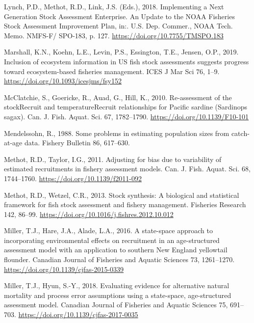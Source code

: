 \documentclass[]{article}
\begin{document}
\leavevmode\hypertarget{ref-lynch2018Implementing}{}%
Lynch, P.D., Methot, R.D., Link, J.S. (Eds.), 2018. Implementing a Next
Generation Stock Assessment Enterprise. An Update to the NOAA Fisheries
Stock Assessment Improvement Plan, in:. U.S. Dep. Commer., NOAA Tech.
Memo. NMFS-F/ SPO-183, p. 127. \url{https://doi.org/10.7755/TMSPO.183}

\leavevmode\hypertarget{ref-marshall2019Inclusion}{}%
Marshall, K.N., Koehn, L.E., Levin, P.S., Essington, T.E., Jensen, O.P.,
2019. Inclusion of ecosystem information in US fish stock assessments
suggests progress toward ecosystem-based fisheries management. ICES J
Mar Sci 76, 1--9. \url{https://doi.org/10.1093/icesjms/fsy152}

\leavevmode\hypertarget{ref-mcclatchie2010Reassessment}{}%
McClatchie, S., Goericke, R., Auad, G., Hill, K., 2010. Re-assessment of
the stockRecruit and temperatureRecruit relationships for Pacific
sardine (Sardinops sagax). Can. J. Fish. Aquat. Sci. 67, 1782--1790.
\url{https://doi.org/10.1139/F10-101}

\leavevmode\hypertarget{ref-mendelssohn1988Problems}{}%
Mendelssohn, R., 1988. Some problems in estimating population sizes from
catch-at-age data. Fishery Bulletin 86, 617--630.

\leavevmode\hypertarget{ref-methot2011Adjusting}{}%
Methot, R.D., Taylor, I.G., 2011. Adjusting for bias due to variability
of estimated recruitments in fishery assessment models. Can. J. Fish.
Aquat. Sci. 68, 1744--1760. \url{https://doi.org/10.1139/f2011-092}

\leavevmode\hypertarget{ref-methot2013Stock}{}%
Methot, R.D., Wetzel, C.R., 2013. Stock synthesis: A biological and
statistical framework for fish stock assessment and fishery management.
Fisheries Research 142, 86--99.
\url{https://doi.org/10.1016/j.fishres.2012.10.012}

\leavevmode\hypertarget{ref-miller2016Statespace}{}%
Miller, T.J., Hare, J.A., Alade, L.A., 2016. A state-space approach to
incorporating environmental effects on recruitment in an age-structured
assessment model with an application to southern New England yellowtail
flounder. Canadian Journal of Fisheries and Aquatic Sciences 73,
1261--1270. \url{https://doi.org/10.1139/cjfas-2015-0339}

\leavevmode\hypertarget{ref-miller2018Evaluating}{}%
Miller, T.J., Hyun, S.-Y., 2018. Evaluating evidence for alternative
natural mortality and process error assumptions using a state-space,
age-structured assessment model. Canadian Journal of Fisheries and
Aquatic Sciences 75, 691--703.
\url{https://doi.org/10.1139/cjfas-2017-0035}
\end{document}
